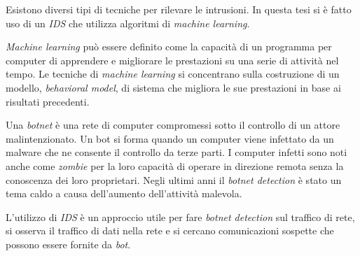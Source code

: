 \documentclass[../main.tex]{subfiles}
\begin{document}
Esistono diversi tipi di tecniche per rilevare le intrusioni. In questa tesi si è fatto uso di un \textit{IDS} che utilizza algoritmi di \textit{machine learning}.

\textit{Machine learning} può essere definito come la capacità di un programma per computer di apprendere e migliorare le prestazioni su una serie di attività nel tempo. Le tecniche di \textit{machine learning} si concentrano sulla costruzione di un modello, \textit{behavioral model}, di sistema che migliora le sue prestazioni in base ai risultati precedenti. \newline

Una \textit{botnet} è una rete di computer compromessi sotto il controllo di un attore malintenzionato. Un bot si forma quando un computer viene infettato da un malware che ne consente il controllo da terze parti. I computer infetti sono noti anche come \textit{zombie} per la loro capacità di operare in direzione remota senza la conoscenza dei loro proprietari. Negli ultimi anni il \textit{botnet detection} è stato un tema caldo a causa dell'aumento dell'attività malevola.

L'utilizzo di \textit{IDS} è un approccio utile per fare \textit{botnet detection} sul traffico di rete, si osserva il traffico di dati nella rete e si cercano comunicazioni sospette che possono essere fornite da \textit{bot}. \newline
\end{document}
